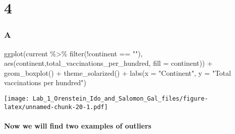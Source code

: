 \documentclass[
]{article}
\newenvironment{Shaded}{\begin{snugshade}}{\end{snugshade}}
\newcommand{\AttributeTok}[1]{\textcolor[rgb]{0.77,0.63,0.00}{#1}}
\newcommand{\FunctionTok}[1]{\textcolor[rgb]{0.00,0.00,0.00}{#1}}
\newcommand{\NormalTok}[1]{#1}
\newcommand{\SpecialCharTok}[1]{\textcolor[rgb]{0.00,0.00,0.00}{#1}}
\newcommand{\StringTok}[1]{\textcolor[rgb]{0.31,0.60,0.02}{#1}}
\begin{document}
\hypertarget{section-3}{%
\section{4}\label{section-3}}

\hypertarget{a-3}{%
\subsubsection{A}\label{a-3}}

\begin{Shaded}
\begin{Highlighting}[]
\FunctionTok{ggplot}\NormalTok{(current }\SpecialCharTok{\%\textgreater{}\%} \FunctionTok{filter}\NormalTok{(}\SpecialCharTok{!}\NormalTok{continent }\SpecialCharTok{==} \StringTok{""}\NormalTok{), }\FunctionTok{aes}\NormalTok{(continent,total\_vaccinations\_per\_hundred, }\AttributeTok{fill =}\NormalTok{ continent)) }\SpecialCharTok{+} 
  \FunctionTok{geom\_boxplot}\NormalTok{() }\SpecialCharTok{+} \FunctionTok{theme\_solarized}\NormalTok{() }\SpecialCharTok{+}
  \FunctionTok{labs}\NormalTok{(}\AttributeTok{x =} \StringTok{"Continent"}\NormalTok{, }\AttributeTok{y =} \StringTok{"Total vaccinations per hundred"}\NormalTok{)}
\end{Highlighting}
\end{Shaded}

\texttt{[image: Lab\_1\_Orenstein\_Ido\_and\_Salomon\_Gal\_files/figure-latex/unnamed-chunk-20-1.pdf]}

\hypertarget{now-we-will-find-two-examples-of-outliers}{%
\paragraph{Now we will find two examples of
outliers}\label{now-we-will-find-two-examples-of-outliers}}
\end{document}
